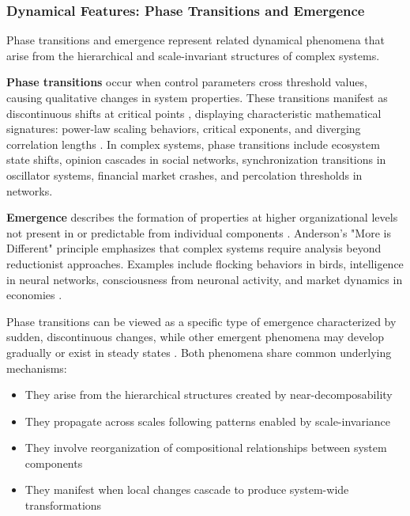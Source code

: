 \subsubsection{Dynamical Features: Phase Transitions and Emergence}

Phase transitions and emergence represent related dynamical phenomena that arise from the hierarchical and scale-invariant structures of complex systems.

\textbf{Phase transitions} occur when control parameters cross threshold values, causing qualitative changes in system properties. These transitions manifest as discontinuous shifts at critical points \citep{stanley1971phase}, displaying characteristic mathematical signatures: power-law scaling behaviors, critical exponents, and diverging correlation lengths \citep{newman2003structure, bak1987self}. In complex systems, phase transitions include ecosystem state shifts, opinion cascades in social networks, synchronization transitions in oscillator systems, financial market crashes, and percolation thresholds in networks.

\textbf{Emergence} describes the formation of properties at higher organizational levels not present in or predictable from individual components \citep{holland1998emergence, anderson1972more}. Anderson's "More is Different" principle emphasizes that complex systems require analysis beyond reductionist approaches. Examples include flocking behaviors in birds, intelligence in neural networks, consciousness from neuronal activity, and market dynamics in economies \citep{camazine2003self, haken1983synergetics}.

Phase transitions can be viewed as a specific type of emergence characterized by sudden, discontinuous changes, while other emergent phenomena may develop gradually or exist in steady states \citep{bar2013computability}. Both phenomena share common underlying mechanisms:

\begin{itemize}
    \item They arise from the hierarchical structures created by near-decomposability
    \item They propagate across scales following patterns enabled by scale-invariance
    \item They involve reorganization of compositional relationships between system components
    \item They manifest when local changes cascade to produce system-wide transformations
\end{itemize}

